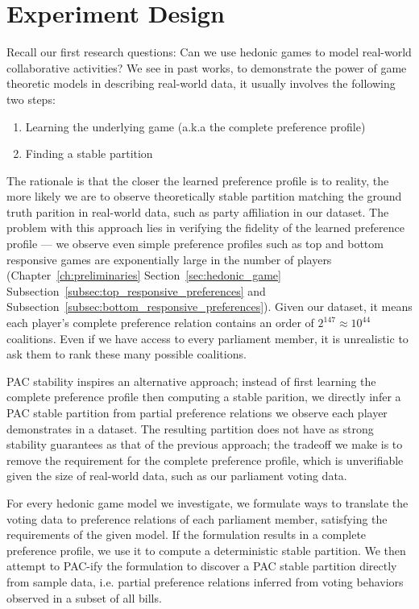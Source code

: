 \section{Experiment Design}

Recall our first research questions: Can we use hedonic games to model
real-world collaborative activities?
We see in past works, to demonstrate the power of game theoretic models
in describing real-world data, it usually involves the following two steps:

\begin{enumerate}
  \item Learning the underlying game (a.k.a the complete preference profile)
  \item Finding a stable partition
\end{enumerate}

The rationale is that the closer the learned preference profile is to reality,
the more likely we are to observe theoretically stable partition matching
the ground truth parition in real-world data, such as party affiliation in
our dataset.
The problem with this approach lies in verifying the fidelity of the learned
preference profile --- we observe even simple preference profiles such as top
and bottom responsive games are exponentially large in the number of players
(Chapter~\ref{ch:preliminaries} Section~\ref{sec:hedonic_game}
Subsection~\ref{subsec:top_responsive_preferences}
and Subsection~\ref{subsec:bottom_responsive_preferences}).
Given our dataset, it means each player's complete preference relation contains
an order of $2^147 \approx 10^44$ coalitions.
Even if we have access to every parliament member, it is unrealistic to ask them
to rank these many possible coalitions.

PAC stability inspires an alternative approach; instead of first learning the
complete preference profile then computing a stable parition, we directly
infer a PAC stable partition from partial preference relations we observe
each player demonstrates in a dataset.
The resulting partition does not have as strong stability guarantees as that
of the previous approach; the tradeoff we make is to remove the requirement for
the complete preference profile, which is unverifiable given the size of
real-world data, such as our parliament voting data.

For every hedonic game model we investigate, we formulate ways to translate the
voting data to preference relations of each parliament member, satisfying the
requirements of the given model.
If the formulation results in a complete preference profile, we use it to
compute a deterministic stable partition.
We then attempt to PAC-ify the formulation to discover a PAC stable partition
directly from sample data, i.e. partial preference relations inferred from
voting behaviors observed in a subset of all bills.

